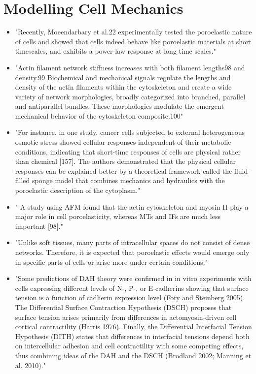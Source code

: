 \documentclass[11pt,a4paper]{article}
\begin{document}
\section{Modelling Cell Mechanics}
\begin{itemize}
\item "Recently, Moeendarbary et al.22 experimentally tested the poroelastic nature of cells and showed that cells indeed behave like poroelastic materials at short timescales, and exhibits a power‐law response at long time scales."\cite{Rajagopal2017}
\item "Actin filament network stiffness increases with both filament lengths98 and density.99 Biochemical and mechanical signals regulate the lengths and density of the actin filaments within the cytoskeleton and create a wide variety of network morphologies, broadly categorized into branched, parallel and antiparallel bundles. These morphologies modulate the emergent mechanical behavior of the cytoskeleton composite.100" \cite{Rajagopal2017}
\item "For instance, in one study, cancer cells subjected to external heterogeneous osmotic stress showed cellular responses independent of their metabolic conditions, indicating that short-time responses of cells are physical rather than chemical [157]. The authors demonstrated that the physical cellular responses can be explained better by a theoretical framework called the fluid-filled sponge model that combines mechanics and hydraulics with the poroelastic description of the cytoplasm." \cite{Jung2020}
\item" A study using AFM found that the actin cytoskeleton and myosin II play a major role in cell poroelasticity, whereas MTs and IFs are much less important [98]."\cite{Jung2020}
\item "Unlike soft tissues, many parts of intracellular spaces do not consist of dense networks. Therefore, it is expected that poroelastic effects would emerge only in specific parts of cells or arise more under certain conditions."\cite{Jung2020}
\item  "Some predictions of DAH theory were confirmed in in vitro experiments with cells expressing different levels of N-, P-, or E-cadherins showing that surface tension is a function of cadherin expression level (Foty and Steinberg 2005). The Differential Surface Contraction Hypothesis (DSCH) proposes that surface tension arises primarily from differences in actomyosin-driven cell cortical contractility (Harris 1976). Finally, the Differential Interfacial Tension Hypothesis (DITH) states that differences in interfacial tensions depend both on intercellular adhesion and cell contractility with some competing effects, thus combining ideas of the DAH and the DSCH (Brodland 2002; Manning et al. 2010)."

\end{itemize}
\end{document}
